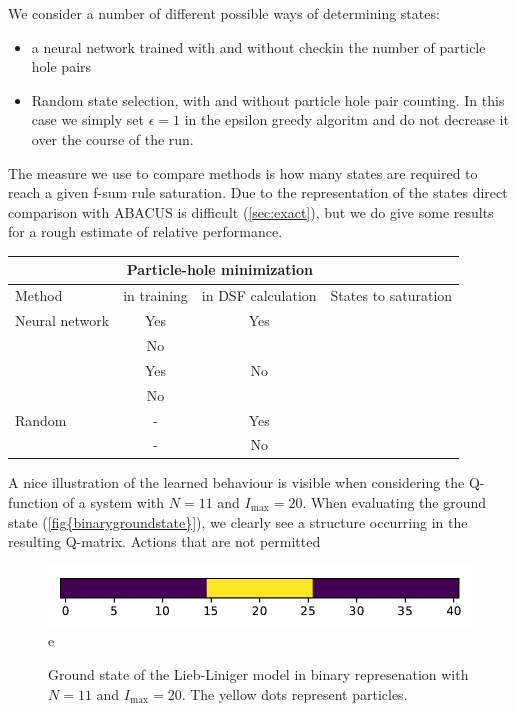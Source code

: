 \documentclass[11pt, a4paper]{report} %
\begin{document}
We consider a number of different possible ways of determining states:
\begin{itemize}
\item a neural network trained with and without checkin the number of particle hole pairs
\item Random state selection, with and without particle hole pair counting. In this case we simply set \(\epsilon=1\) in the epsilon greedy algoritm and do not decrease it over the course of the run.
\end{itemize}

The measure we use to compare methods is how many states are required to reach a given f-sum rule saturation.
Due to the representation of the states direct comparison with ABACUS is difficult (\cref{sec:exact}), but we do give some results for a rough estimate of relative performance.

\begin{table}
  \centering
  \begin{tabular}{l|cc|r}
    & \multicolumn{2}{c|}{Particle-hole minimization} & \\\hline
   Method & in training & in DSF calculation & States to saturation \\\hline
    Neural network & Yes & Yes\\
          & No &  &\\
    & Yes & No & \\
    & No &  & \\\hline
    Random & - & Yes & \\
          & - & No & \\
  \end{tabular}
\end{table}



A nice illustration of the learned behaviour is visible when considering the Q-function of a system with \(N=11\) and \(I_{\max}=20\).
When evaluating the ground state (\cref{fig{binarygroundstate}}), we clearly see a structure occurring in the resulting Q-matrix.
Actions that are not permitted

\begin{figure}[tb!]
  \centering
  \includegraphics{state.pdf}
e  \caption{Ground state of the Lieb-Liniger model in binary represenation with \(N=11\) and \(I_{\max}=20\). The yellow dots represent particles.}
  \label{fig:binarygroundstate}
\end{figure}
\end{document}
